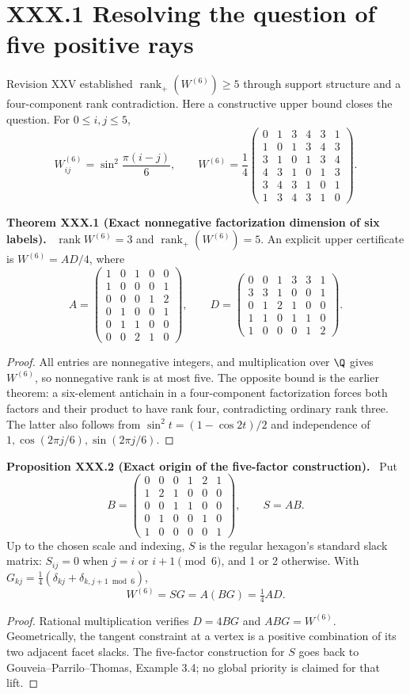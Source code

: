 \documentclass[11pt,a4paper,oneside]{book}
\DeclareMathOperator{\rank}{rank}\DeclareMathOperator{\Tr}{Tr}
\newcommand{\statement}[3]{\par\medskip\noindent\textbf{#1 #2 (#3).}\ }
\begin{document}
\section*{XXX.1 Resolving the question of five positive rays}
Revision XXV established $\rank_+(W^{(6)})\ge5$ through support structure and a four-component rank contradiction. Here a constructive upper bound closes the question. For $0\le i,j\le5$,
\[W^{(6)}_{ij}=\sin^2\frac{\pi(i-j)}6,\qquad W^{(6)}=\frac14\begin{pmatrix}0&1&3&4&3&1\\1&0&1&3&4&3\\3&1&0&1&3&4\\4&3&1&0&1&3\\3&4&3&1&0&1\\1&3&4&3&1&0\end{pmatrix}.\]
\statement{Theorem}{XXX.1}{Exact nonnegative factorization dimension of six labels} $\rank W^{(6)}=3$ and $\rank_+(W^{(6)})=5$. An explicit upper certificate is $W^{(6)}=AD/4$, where
\[A=\begin{pmatrix}1&0&1&0&0\\1&0&0&0&1\\0&0&0&1&2\\0&1&0&0&1\\0&1&1&0&0\\0&0&2&1&0\end{pmatrix},\qquad D=\begin{pmatrix}0&0&1&3&3&1\\3&3&1&0&0&1\\0&1&2&1&0&0\\1&1&0&1&1&0\\1&0&0&0&1&2\end{pmatrix}.\]
\begin{proof}All entries are nonnegative integers, and multiplication over $\Q$ gives $W^{(6)}$, so nonnegative rank is at most five. The opposite bound is the earlier theorem: a six-element antichain in a four-component factorization forces both factors and their product to have rank four, contradicting ordinary rank three. The latter also follows from $\sin^2t=(1-\cos2t)/2$ and independence of $1,\cos(2\pi j/6),\sin(2\pi j/6)$.\end{proof}
\statement{Proposition}{XXX.2}{Exact origin of the five-factor construction} Put
\[B=\begin{pmatrix}0&0&0&1&2&1\\1&2&1&0&0&0\\0&0&1&1&0&0\\0&1&0&0&1&0\\1&0&0&0&0&1\end{pmatrix},\qquad S=AB.\]
Up to the chosen scale and indexing, $S$ is the regular hexagon's standard slack matrix: $S_{ij}=0$ when $j=i$ or $i+1\pmod6$, and 1 or 2 otherwise. With $G_{kj}=\frac14(\delta_{kj}+\delta_{k,j+1\bmod6})$,
\[W^{(6)}=SG=A(BG)=\tfrac14AD.\]
\begin{proof}Rational multiplication verifies $D=4BG$ and $ABG=W^{(6)}$. Geometrically, the tangent constraint at a vertex is a positive combination of its two adjacent facet slacks. The five-factor construction for $S$ goes back to Gouveia--Parrilo--Thomas, Example 3.4; no global priority is claimed for that lift.\end{proof}
\end{document}
